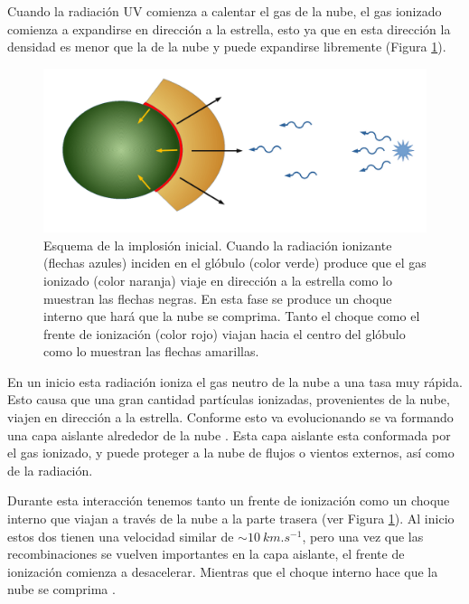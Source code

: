 \documentclass{book}
\begin{document}
Cuando la radiación UV comienza a calentar el gas de la nube, el gas ionizado comienza a expandirse en dirección a la estrella, esto ya que en esta dirección la densidad es menor que la de la nube y puede expandirse libremente (Figura \ref{fig:evolucion de la nube}). 

\begin{figure}[htb]
    \centering
    \includegraphics[width= \textwidth]{ultimos/implosion_inicial.pdf}
    \caption{Esquema de la implosión inicial. Cuando la radiación ionizante (flechas azules) inciden en el glóbulo (color verde)  produce que el gas ionizado (color naranja) viaje en dirección a la estrella como lo muestran las flechas negras. En esta fase se produce un choque interno que hará que la nube se comprima. Tanto el choque como el frente de ionización  (color rojo) viajan hacia el centro del glóbulo como lo muestran las flechas amarillas.}
    \label{fig:evolucion de la nube}
\end{figure}

En un inicio esta radiación ioniza el gas neutro de la nube a una tasa muy rápida. Esto causa que una gran cantidad partículas ionizadas, provenientes de la nube, viajen en dirección a la estrella. Conforme esto va evolucionando se va formando una capa aislante alrededor de la nube \citep{OortySpitzer_1955}. Esta capa aislante esta conformada por el gas ionizado, y puede proteger a la nube de flujos o vientos externos, así como de la radiación.

Durante esta interacción tenemos tanto un frente de ionización como un choque interno que viajan a través de la nube a la parte trasera (ver Figura \ref{fig:evolucion de la nube}). Al inicio estos dos tienen una velocidad similar de $\sim\SI{10}{km.s^{-1}}$, pero una vez que las recombinaciones se vuelven importantes en la capa aislante, el frente de ionización comienza a desacelerar. Mientras que el choque interno hace que la nube se comprima \citep{Bertoldi_1989}.
\end{document}
